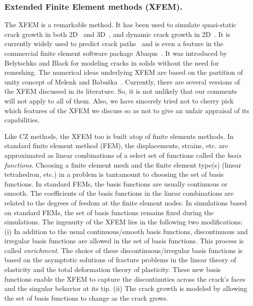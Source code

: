 \documentclass[10pt,letterpaper]{article}
\begin{document}
    \subsubsection{Extended Finite Element methods (XFEM).} The XFEM is a remarkable method. It has been used to  simulate quasi-static crack growth in both 2D~\cite{belytschko1999elastic,bordas2007extended,dolbow1999finite} and 3D~\cite{sukumar2000extended,moes2002non,gravouil2002non}, and dynamic crack growth in 2D~\cite{belytschko2003dynamic,song2006method}. It is currently widely used to predict crack paths~\cite{golewski2012numerical,barkai2012crack,peng2017extended} and is even a feature in the commercial finite element software package Abaqus~\cite{abaqus2014}. It was introduced by Belytschko and Black \cite{belytschko1999elastic} for modeling cracks in solids without the need for remeshing. The numerical ideas underlying XFEM  are based on the partition of unity concept of Melenk and Babu\v ska~\cite{melenk1996partition}.  Currently, there are several versions of the XFEM  discussed in its literature. So, it is not unlikely that our comments will not apply to all of them. Also, we have sincerely tried not to cherry pick which features of the XFEM we discuss so as not to give an unfair appraisal of its capabilities.

    Like CZ methods, the XFEM too is built atop of finite elements methods. In  standard finite element method (FEM), the displacements, strains, etc. are approximated as  linear combinations of a select set of functions called  the \textit{basis functions}. Choosing a finite element mesh and the finite element type(s) (linear tetrahedron, etc.) in a problem  is tantamount to choosing the set of basis functions. In standard FEMs, the basis functions are usually continuous or smooth. The coefficients of the basis functions in the linear combinations are related to the degrees of feedom at the finite element nodes. In simulations based on  standard FEMs, the set of basis functions remains fixed during the simulations. The ingenuity of the XFEM lies in the following two modifications: (i) In addition to the usual continuous/smooth basis functions, discontinuous and irregular basis functions are allowed in the  set of basis functions. This process is called \textit{enrichment}. The choice of these discontinuous/irregular basis functions is  based  on the asymptotic solutions of fracture problems in the linear theory of elasticity and the total deformation theory of plasticity. These new basis functions enable the XFEM to capture the discontinuties across the crack's faces and the singular behavior  at its  tip. (ii) The  crack growth is modeled by allowing the set of basis functions to change as the crack grows.
\end{document}
